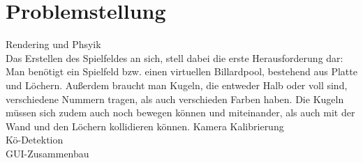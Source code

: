 
\chapter{Problemstellung}
Rendering und Phsyik \\
Das Erstellen des Spielfeldes an sich, stell dabei die erste Herausforderung dar: Man benötigt ein Spielfeld bzw. einen virtuellen Billardpool, bestehend aus Platte und Löchern. Außerdem braucht man Kugeln, die entweder Halb oder voll sind, verschiedene Nummern tragen, als auch verschieden Farben haben. Die Kugeln müssen sich zudem auch noch bewegen können und miteinander, als auch mit der Wand und den Löchern kollidieren können. 
Kamera Kalibrierung \\
Kö-Detektion \\
GUI-Zusammenbau \\

